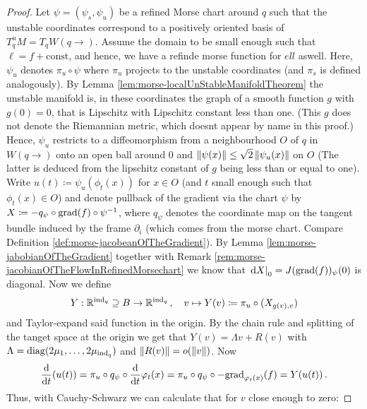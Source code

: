 \begin{proof}
Let $\psi=(\psi_s,\psi_u)$ be a refined Morse chart around $q$ such that the unstable coordinates correspond to a positively oriented basis of $T^u_qM=T_qW(q\to)$. Assume the domain to be small enough such that $\ell=f+\mathrm{const}$, and hence, we have a refinde morse function for $ell$ aswell.
Here, $\psi_u$ denotes $\pi_u\circ \psi$ where $\pi_u$ projects to the unstable coordinates (and $\pi_s$ is defined analogously). 
By Lemma \ref{lem:morse-localUnStableManifoldTheorem} the unstable manifold is, in these coordinates the graph of a smooth function $g$ with $g(0)=0$, that is Lipschitz with Lipschitz constant less than one. (This $g$ does not denote the Riemannian metric, which doesnt appear by name in this proof.)
Hence, $\psi_u$ restricts to a diffeomorphism from a neighbourhood $O$ of $q$ in $W(q\to)$ onto an open ball around $0$ and $\left\lVert\psi(x)\right\rVert\leq \sqrt{2}\left\lVert\psi_u(x)\right\rVert$ on $O$ 
(The latter is deduced from the lipschitz constant of $g$  being less than or equal to one). Write $u(t)\coloneq \psi_u(\phi_t(x))$ for $x\in O$ (and $t$ small enough such that $\phi_t(x)\in O$) and denote pullback of the gradient via the chart $\psi$ by $X\coloneq -q_{\psi}\circ \mathrm{grad}(f)\circ \psi^{-1}$, where $q_\psi$ denotes the coordinate map on the tangent bundle induced by the frame $\partial_i$ (which comes from the morse chart. Compare Definition \ref{def:morse-jacobeanOfTheGradient}). 
By Lemma \ref{lem:morse-jabobianOfTheGradient} together with Remark \ref{rem:morse-jacobianOfTheFlowInRefinedMorsechart} we know that $\left.\mathop{}\!\mathrm{d} X\right|_{0}=J(\mathrm{grad}(f))_{\psi}(0)$ is diagonal. Now we define 
\begin{equation*}
	Y:\mathbb{R}^{\mathrm{ind}_q}\supseteq B \to \mathbb{R}^{\mathrm{ind}_q}\,,\quad v\mapsto Y(v)\coloneq \pi_u \circ (X_{g(v),v})
\end{equation*} and Taylor-expand said function in the origin. By the chain rule and splitting of the tanget space at the origin we get that $Y(v)=\Lambda v+R(v)$ with $\Lambda=\mathrm{diag}(2\mu_1,\dots ,2\mu_{\mathrm{ind}_q})$ and $\left\lVert R(v)\right\rVert=o(\left\lVert v\right\rVert)$.
 Now \begin{equation*}
	\frac{\mathop{}\!\mathrm{d}}{\mathop{}\!\mathrm{d} t} (u(t))=\pi_u \circ  q_\psi\circ \frac{\mathop{}\!\mathrm{d}}{\mathop{}\!\mathrm{d} t} \varphi_t(x)=\pi_u \circ q_\psi \circ -\mathrm{grad}_{\varphi_t(x)}(f)=Y(u(t))\,.
\end{equation*} Thus, with Cauchy-Schwarz we can calculate that for $v$ close enough to zero:


\end{proof}
